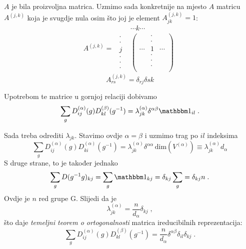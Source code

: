 $A$ je bila proizvoljna matrica. Uzmimo sada konkretnije na mjesto $A$
matricu $A^{(j,k)}$ koja je svugdje nula osim što joj je
element $A^{(j,k)}_{jk}=1$:
\begin{displaymath}
 A^{(j,k)}=
\begin{array}{cc}
 & \cdots k \cdots \\
        \begin{array}{c}
         \cdot \\ \cdot \\ j \\ \cdot \\ \cdot \\ \cdot 
        \end{array}
 & 
\begin{pmatrix}
  & \cdot & \\
  & \cdot & \\
 \cdots & 1  & \cdots \\
  & \cdot & \\
  & \cdot & \\
  & \cdot & \\
\end{pmatrix}
\end{array}
\end{displaymath}
\begin{displaymath}
A^{(j,k)}_{rs}=\delta_{rj}\delta{sk} 
\end{displaymath}

Upotrebom te matrice u gornjoj relaciji dobivamo
\begin{displaymath}
\sum_g D^{(\alpha)}_{ij}(g) D^{(\beta)}_{kl}(g^{-1}) = 
 \lambda^{(\alpha)}_{jk} \delta^{\alpha\beta} \Eins_{il} \;.
\end{displaymath}

Sada treba odrediti $\lambda_{jk}$. 
Stavimo ovdje $\alpha =\beta$ i uzmimo trag po $il$ indeksima
\begin{displaymath}
\sum_g D^{(\alpha)}_{ij}(g) D^{(\alpha)}_{ki}(g^{-1}) = 
 \lambda^{(\alpha)}_{jk} \delta^{\alpha\alpha}\, \textrm{dim}(V^{(\alpha)})
 \equiv \lambda^{(\alpha)}_{jk} d_{\alpha}
\end{displaymath}
S druge strane, to je također jednako
\begin{displaymath}
 \sum_g D(g^{-1}g)_{kj}= \sum_g \Eins_{kj} = \delta_{kj} \sum_g 
 = \delta_{kj} n \;.
\end{displaymath}
Ovdje je $n$ red grupe G.
Slijedi da je
\begin{displaymath}
\lambda^{(\alpha)}_{jk}= \frac{n}{d_{\alpha}}\delta_{kj} \;,
\end{displaymath}
što daje \emph{temeljni teorem o ortogonalnosti} matrica ireducibilnih
reprezentacija:
\begin{displaymath}
\sum_g D^{(\alpha)}_{ij}(g) D^{(\beta)}_{kl}(g^{-1}) =
 \frac{n}{d_{\alpha}}\delta^{\alpha\beta}\delta_{il}\delta_{kj} \;.
\end{displaymath}



